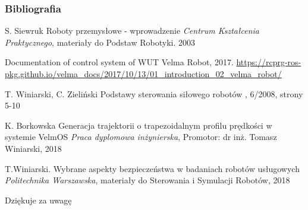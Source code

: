 
\begin{frame}
\frametitle{Bibliografia}
\footnotesize{
\begin{thebibliography}{99} %
 S. Siewruk
\newblock Roboty przemysłowe - wprowadzenie
\newblock \emph{Centrum Kształcenia Praktycznego}, materiały do Podstaw Robotyki. 2003

 Documentation of control system of WUT Velma Robot, 2017.
\newblock \url{https://rcprg-ros-pkg.github.io/velma\_docs/2017/10/13/01\_introduction\_02\_velma\_robot/}

 T. Winiarski, C. Zieliński
\newblock Podstawy sterowania siłowego robotów
, 6/2008, strony 5-10

 K. Borkowska
\newblock Generacja trajektorii o trapezoidalnym profilu prędkości w systemie VelmOS
\newblock \emph{Praca dyplomowa inżynierska}, Promotor: dr inż. Tomasz Winiarski, 2018

 T.Winiarski.
\newblock Wybrane aspekty bezpieczeństwa w badaniach robotów usługowych
\newblock \emph{Politechnika Warszawska}, materiały do Sterowania i Symulacji Robotów, 2018 
\end{thebibliography}
}
\end{frame}


\begin{frame}
\Huge{\centerline{Dziękuje za uwagę}}
\end{frame}